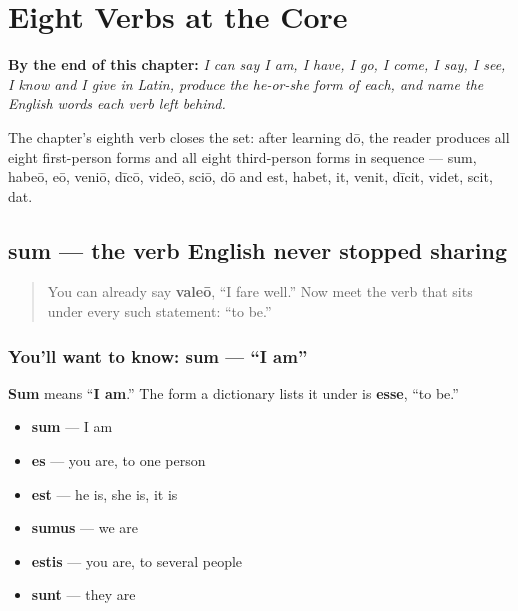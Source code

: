 
\chapter{Eight Verbs at the Core}
\label{ch:la-core-verbs}

\begin{chapteropening}
\textbf{By the end of this chapter:} \emph{I can say I am, I have, I go, I come, I say, I see, I know and I give in Latin, produce the he-or-she form of each, and name the English words each verb left behind.}

The chapter's eighth verb closes the set: after learning dō, the reader produces all eight first-person forms and all eight third-person forms in sequence — sum, habeō, eō, veniō, dīcō, videō, sciō, dō and est, habet, it, venit, dīcit, videt, scit, dat.
\end{chapteropening}

\section[sum, esse]{sum — the verb English never stopped sharing}

\label{lesson:LA-C37-sum}



\begin{quote}
You can already say \textbf{valeō}, \textquotedblleft{}I fare well.\textquotedblright{} Now meet the verb that sits under every such statement: \textquotedblleft{}to be.\textquotedblright{}
\end{quote}

\subsection*{You'll want to know: sum — \textquotedblleft{}I am\textquotedblright{}}
\textbf{Sum} means \textquotedblleft{}\textbf{I am}.\textquotedblright{} The form a dictionary lists it under is \textbf{esse}, \textquotedblleft{}to be.\textquotedblright{}

\begin{itemize}
\raggedright
  \item \textbf{sum} — I am
  \item \textbf{es} — you are, to one person
  \item \textbf{est} — he is, she is, it is
  \item \textbf{sumus} — we are
  \item \textbf{estis} — you are, to several people
  \item \textbf{sunt} — they are
\end{itemize}

